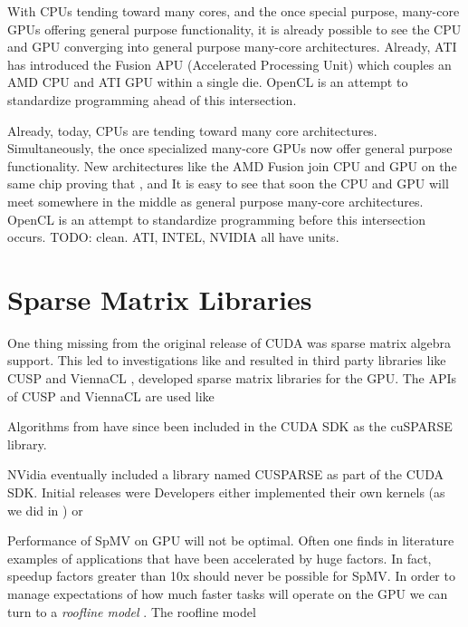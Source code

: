 \documentclass{report}
\begin{document}
With CPUs tending toward many cores, and the once special purpose, many-core GPUs offering general purpose functionality, it is already possible to see the CPU and GPU converging into general purpose many-core architectures. Already, ATI has introduced the Fusion APU (Accelerated Processing Unit) which couples an AMD CPU and ATI GPU within a single die. OpenCL is an attempt to standardize programming ahead of this intersection. 


 Already, today, CPUs are tending toward many core architectures. Simultaneously, the once specialized many-core GPUs now offer general purpose functionality. New architectures like the AMD Fusion \cite{AMDFusion} join CPU and GPU on the same chip proving that 
, and It is easy to see that soon the CPU and GPU will meet somewhere in the middle as general purpose many-core architectures. OpenCL is an attempt to standardize programming before this intersection occurs. 
TODO: clean. ATI, INTEL, NVIDIA all have units. 

\section{Sparse Matrix Libraries}

One thing missing from the original release of CUDA was sparse matrix algebra support. 
This led to investigations like \cite{Bell2009,SuKeutzer2012} and resulted in third party libraries like CUSP \cite{Cusp2012} and ViennaCL \cite{Rupp2010,Rupp2010a}, developed sparse matrix libraries for the GPU. The APIs of CUSP and ViennaCL are used like 

Algorithms from \cite{Bell2009} have since been included in the CUDA SDK as the cuSPARSE library. 

NVidia eventually included a library named CUSPARSE as part of the CUDA SDK. Initial releases were 
Developers either implemented their own kernels (as we did in \cite{BolligFlyerErlebacher2012}) or   



Performance of SpMV on GPU will not be optimal. Often one finds in literature examples of applications that have been accelerated by huge factors. In fact, speedup factors greater than 10x should never be possible for SpMV. In order to manage expectations of how much faster tasks will operate on the GPU we can turn to a \emph{roofline model} \cite{Williams2009}. The roofline model 
\end{document}
